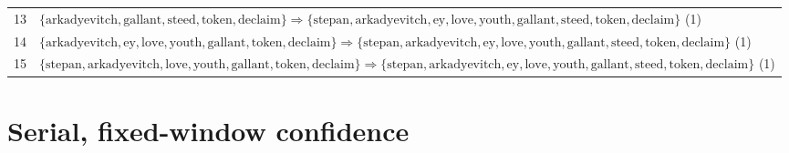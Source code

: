 \begin{appendices}
\begin{longtable}{p{20pt}|p{\dimexpr\textwidth-\tabcolsep-20pt\relax}}
13 & $ \{ \text{arkadyevitch},\allowbreak\text{gallant},\allowbreak\text{steed},\allowbreak\text{token},\allowbreak\text{declaim} \} \Rightarrow \{ \text{stepan},\allowbreak\text{arkadyevitch},\allowbreak\text{ey},\allowbreak\text{love},\allowbreak\text{youth},\allowbreak\text{gallant},\allowbreak\text{steed},\allowbreak\text{token},\allowbreak\text{declaim} \} $ (1) \\
14 & $ \{ \text{arkadyevitch},\allowbreak\text{ey},\allowbreak\text{love},\allowbreak\text{youth},\allowbreak\text{gallant},\allowbreak\text{token},\allowbreak\text{declaim} \} \Rightarrow \{ \text{stepan},\allowbreak\text{arkadyevitch},\allowbreak\text{ey},\allowbreak\text{love},\allowbreak\text{youth},\allowbreak\text{gallant},\allowbreak\text{steed},\allowbreak\text{token},\allowbreak\text{declaim} \} $ (1) \\
15 & $ \{ \text{stepan},\allowbreak\text{arkadyevitch},\allowbreak\text{love},\allowbreak\text{youth},\allowbreak\text{gallant},\allowbreak\text{token},\allowbreak\text{declaim} \} \Rightarrow \{ \text{stepan},\allowbreak\text{arkadyevitch},\allowbreak\text{ey},\allowbreak\text{love},\allowbreak\text{youth},\allowbreak\text{gallant},\allowbreak\text{steed},\allowbreak\text{token},\allowbreak\text{declaim} \} $ (1) \\
\end{longtable}

\section{Serial, fixed-window confidence}


\end{appendices}
